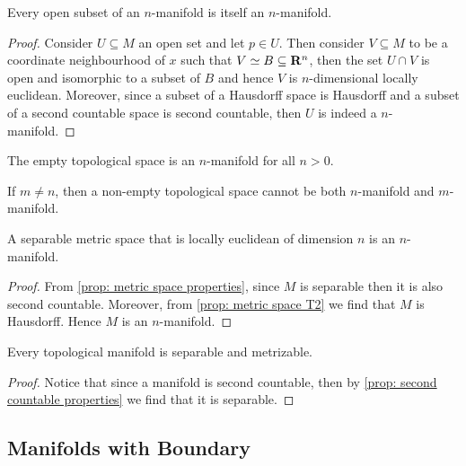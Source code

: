 \begin{proposition}
Every open subset of an \(n\)-manifold is itself an \(n\)-manifold.
\end{proposition}

\begin{proof}
Consider \(U \subseteq M\) an open set and let \(p \in U\). Then consider \(V
\subseteq M\) to be a coordinate neighbourhood of \(x\) such that \(V \simeq B
\subseteq \mathbf{R}^n\), then the set \(U \cap V\) is open and isomorphic
to a subset of \(B\) and hence \(V\) is \(n\)-dimensional locally euclidean.
Moreover, since a subset of a Hausdorff space is Hausdorff and a subset of a
second countable space is second countable, then \(U\) is indeed a
\(n\)-manifold.
\end{proof}

\begin{definition}
The empty topological space is an \(n\)-manifold for all \(n > 0\).
\end{definition}

\begin{theorem}\label{def: manifold dimension invariance}
If \(m \neq n\), then a non-empty topological space cannot be both
\(n\)-manifold and \(m\)-manifold.
\end{theorem}

\begin{proposition}
A separable metric space that is locally euclidean of dimension \(n\) is an
\(n\)-manifold.
\end{proposition}

\begin{proof}
From \cref{prop: metric space properties}, since \(M\) is separable then it is
also second countable. Moreover, from \cref{prop: metric space T2} we find
that \(M\) is Hausdorff. Hence \(M\) is an \(n\)-manifold.
\end{proof}

\begin{proposition}
Every topological manifold is separable and metrizable.
\end{proposition}

\begin{proof}
Notice that since a manifold is second countable, then by \cref{prop: second
countable properties} we find that it is separable.
\end{proof}

\subsection{Manifolds with Boundary}


